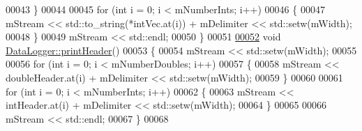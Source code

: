 \begin{DoxyCode}
00043     \}
00044 
00045     \textcolor{keywordflow}{for} (\textcolor{keywordtype}{int} i = 0; i < mNumberInts; i++)
00046     \{
00047         mStream << std::to\_string(*intVec.at(i)) + mDelimiter << std::setw(mWidth);
00048     \}
00049     mStream << std::endl;
00050 \}
00051 
\hyperlink{group___tools_ad7247b2350411b48f323de6c91e8479c}{00052} \textcolor{keywordtype}{void} \hyperlink{group___tools_ad7247b2350411b48f323de6c91e8479c}{DataLogger::printHeader}()
00053 \{
00054     mStream << std::setw(mWidth);
00055 
00056     \textcolor{keywordflow}{for} (\textcolor{keywordtype}{int} i = 0; i < mNumberDoubles; i++)
00057     \{
00058         mStream << doubleHeader.at(i) + mDelimiter << std::setw(mWidth);
00059     \}
00060 
00061     \textcolor{keywordflow}{for} (\textcolor{keywordtype}{int} i = 0; i < mNumberInts; i++)
00062     \{
00063         mStream << intHeader.at(i) + mDelimiter << std::setw(mWidth);
00064     \}
00065 
00066     mStream << std::endl;
00067 \}
00068 
\end{DoxyCode}
